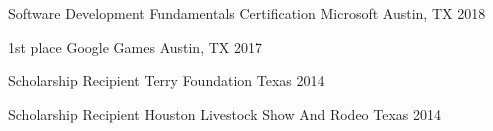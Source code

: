 

\begin{cvhonors}

  \cvhonor
    {Software Development Fundamentals Certification} %
    {Microsoft} %
    {Austin, TX} %
    {2018} %
    
  \cvhonor
    {1st place} %
    {Google Games} %
    {Austin, TX} %
    {2017} %

  \cvhonor
    {Scholarship Recipient} %
    {Terry Foundation} %
    {Texas} %
    {2014} %

  \cvhonor
    {Scholarship Recipient} %
    {Houston Livestock Show And Rodeo} %
    {Texas} %
    {2014} %

\end{cvhonors}
